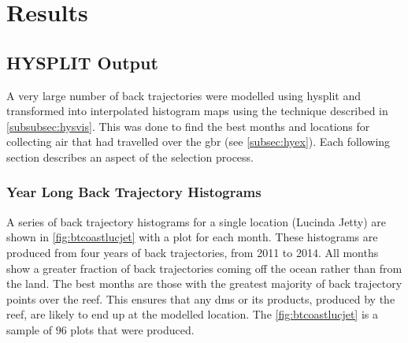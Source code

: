 \chapter{Results}
\label{ch:resu}

\section{HYSPLIT Output}
\label{sec:hysplitresults}

A very large number of back trajectories were modelled using \gls{hysplit} and transformed into interpolated histogram maps using the technique described in \cref{subsubsec:hysvis}. This was done to find the best months and locations for collecting air that had travelled over the \gls{gbr} (see \cref{subsec:hyex}). Each following section describes an aspect of the selection process.

\subsection{Year Long Back Trajectory Histograms}
\label{subsec:yearbt}

A series of back trajectory histograms for a single location (Lucinda Jetty) are shown in \cref{fig:btcoastlucjet} with a plot for each month. These histograms are produced from four years of back trajectories, from 2011 to 2014. All months show a greater fraction of back trajectories coming off the ocean rather than from the land. The best months are those with the greatest majority of back trajectory points over the reef. This ensures that any \gls{dms} or its products, produced by the reef, are likely to end up at the modelled location. The \cref{fig:btcoastlucjet} is a sample of $96$ plots that were produced.


